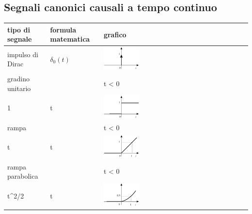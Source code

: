 \subsection{Segnali canonici causali a tempo continuo}
\begin{center}
	\begin{tabularx}{\textwidth}{l | l | X}
		\textbf{tipo di segnale} & \textbf{formula matematica} & \textbf{grafico} \\
		\toprule
		impulso di Dirac & \(\delta_0(t)\) & \includegraphics[width=0.25\textwidth]{immagini/dirac1.png} \\
		\midrule
		gradino unitario & \(\delta_{-1}(t) = \begin{cases} 0 & t < 0 \\ 1 & t \geq 0 \end{cases}\) & \includegraphics[width=0.25\textwidth]{immagini/gradino.png} \\
		\midrule
		rampa & \(\delta_{-2}(t) = \begin{cases} 0 & t < 0 \\ t & t \geq 0 \end{cases}\) & \includegraphics[width=0.25\textwidth]{immagini/rampa.png} \\
		\midrule
		rampa parabolica & \(\delta_{-3}(t) = \begin{cases} 0 & t < 0 \\ t^2/2 & t \geq 0 \end{cases}\) & \includegraphics[width=0.25\textwidth]{immagini/rampa parabolica.png} \\
	\end{tabularx}
\end{center}
